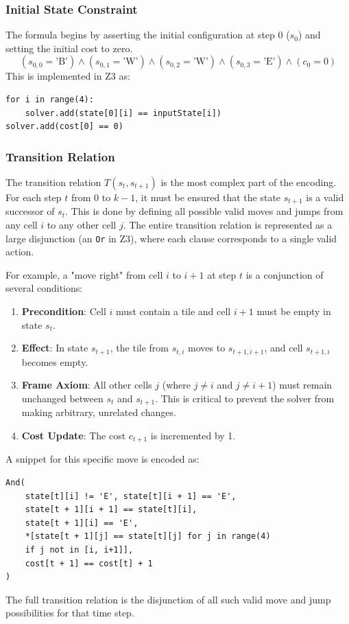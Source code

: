 \documentclass[12pt, a4paper, oneside]{report} %
\begin{document}
\subsubsection{Initial State Constraint}
The formula begins by asserting the initial configuration at step 0 ($s_0$) and setting the initial cost to zero.
$$ (s_{0,0} = \text{'B'}) \land (s_{0,1} = \text{'W'}) \land (s_{0,2} = \text{'W'}) \land (s_{0,3} = \text{'E'}) \land (c_0 = 0) $$
This is implemented in Z3 as:
\begin{verbatim}
for i in range(4):
    solver.add(state[0][i] == inputState[i])
solver.add(cost[0] == 0)
\end{verbatim}

\subsubsection{Transition Relation}
The transition relation \( T(s_t, s_{t+1}) \) is the most complex part of the encoding. For each step \( t \) from \( 0 \) to \( k-1 \), it must be ensured that the state \( s_{t+1} \) is a valid successor of \( s_t \). This is done by defining all possible valid moves and jumps from any cell \( i \) to any other cell \( j \). The entire transition relation is represented as a large disjunction (an \texttt{Or} in Z3), where each clause corresponds to a single valid action.

For example, a "move right" from cell $i$ to $i+1$ at step $t$ is a conjunction of several conditions:
\begin{enumerate}
    \item \textbf{Precondition}: Cell $i$ must contain a tile and cell $i+1$ must be empty in state $s_t$.
    \item \textbf{Effect}: In state $s_{t+1}$, the tile from $s_{t,i}$ moves to $s_{t+1, i+1}$, and cell $s_{t+1, i}$ becomes empty.
    \item \textbf{Frame Axiom}: All other cells $j$ (where $j \neq i$ and $j \neq i+1$) must remain unchanged between $s_t$ and $s_{t+1}$. This is critical to prevent the solver from making arbitrary, unrelated changes.
    \item \textbf{Cost Update}: The cost $c_{t+1}$ is incremented by 1.
\end{enumerate}
A snippet for this specific move is encoded as:
\begin{verbatim}
And(
    state[t][i] != 'E', state[t][i + 1] == 'E',
    state[t + 1][i + 1] == state[t][i],
    state[t + 1][i] == 'E',
    *[state[t + 1][j] == state[t][j] for j in range(4) 
    if j not in [i, i+1]],
    cost[t + 1] == cost[t] + 1
)
\end{verbatim}
The full transition relation is the disjunction of all such valid move and jump possibilities for that time step.
\end{document}
